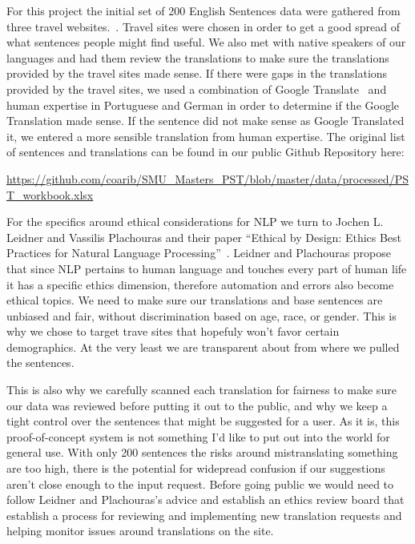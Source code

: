 \documentclass[runningheads]{llncs}
\begin{document}
For this project the initial set of 200 English Sentences data were gathered from three travel websites.~\cite{ref_url11,ref_url12,ref_url13}. Travel sites were chosen in order to get a good spread of what sentences people might find useful. We also met with native speakers of our languages and had them review the translations to make sure the translations provided by the travel sites made sense. If there were gaps in the translations provided by the travel sites, we used a combination of Google Translate~\cite{ref_url14} and human expertise in Portuguese and German in order to determine if the Google Translation made sense. If the sentence did not make sense as Google Translated it, we entered a more sensible translation from human expertise. The original list of sentences and translations can be found in our public Github Repository here:

\url{https://github.com/coarib/SMU_Masters_PST/blob/master/data/processed/PST_workbook.xlsx}

For the specifics around ethical considerations for NLP we turn to Jochen L. Leidner and Vassilis Plachouras and their paper ``Ethical by Design: Ethics Best Practices for Natural Language Processing''~\cite{ref_url15}.  Leidner and Plachouras propose that since NLP pertains to human language and touches every part of human life it has a specific ethics dimension, therefore automation and errors also become ethical topics. We need to make sure our translations and base sentences are unbiased and fair, without discrimination based on age, race, or gender. This is why we chose to target trave sites that hopefuly won't favor certain demographics. At the very least we are transparent about from where we pulled the sentences.

This is also why we carefully scanned each translation for fairness to make sure our data was reviewed before putting it out to the public, and why we keep a tight control over the sentences that might be suggested for a user. As it is, this proof-of-concept system is not something I'd like to put out into the world for general use. With only 200 sentences the risks around mistranslating something are too high, there is the potential for widepread confusion if our suggestions aren't close enough to the input request. Before going public we would need to follow Leidner and Plachouras's advice and establish an ethics review board that establish a process for reviewing and implementing new translation requests and helping monitor issues around translations on the site.
	
\end{document}
